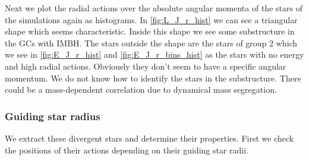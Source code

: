 \par Next we plot the radial actions over the absolute angular momenta of the stars of the simulations again as histograms. In \ref{fig:L_J_r_hist} we can see a triangular shape which seems characteristic. Inside this shape we see some substructure in the \acp{GC} with \ac{IMBH}. The stars outside the shape are the stars of group 2 which we see in \ref{fig:E_J_r_hist} and \ref{fig:E_J_r_bins_hist} as the stars with no energy and high radial actions. Obviously they don't seem to have a specific angular momentum. We do not know how to identify the stars in the substructure. There could be a mass-dependent correlation due to dynamical mass segregation.

\subsubsection{Guiding star radius}
\par We extract these divergent stars and determine their properties. First we check the positions of their actions depending on their guiding star radii.
